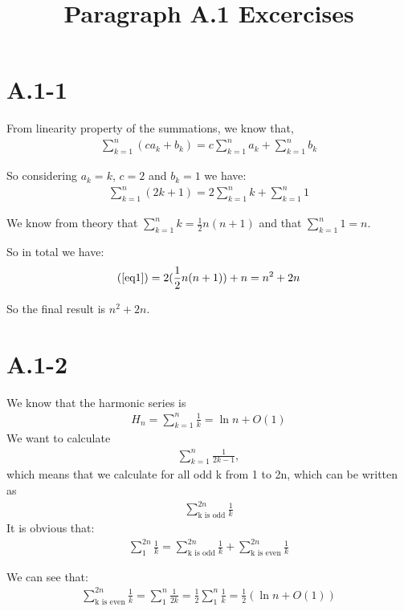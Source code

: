 \documentclass{article}
\title{Paragraph A.1 Excercises}
\begin{document}
\date{}
\author{}

\maketitle

\section*{A.1-1}
From linearity property of the summations, we know that,\begin{gather*}
    \sum_{k=1}^{n}{(ca_{k} + b_{k})} = c\sum_{k=1}^{n}{a_{k}} + \sum_{k=1}^{n}{b_{k}}
\end{gather*} 

So considering $a_{k} = k$, $c = 2$ and $b_{k} = 1$ we have:
\begin{gather}
    \sum_{k=1}^{n}{(2k + 1)} = 2\sum_{k=1}^{n}{k} + \sum_{k=1}^{n}{1} \label{eq1}
\end{gather} 

We know from theory that $\sum_{k=1}^{n}{k} = \frac{1}{2}n(n+1)$ and that $\sum_{k=1}^{n}{1} = n$.

So in total we have:
\begin{gather*}
    (\ref{eq1}) = 2(\frac{1}{2}n(n+1)) + n = n^{2} + 2n
\end{gather*}

So the final result is $n^{2} + 2n$.

\section*{A.1-2}
We know that the harmonic series is 
\begin{gather*}
    H_{n} = \sum_{k=1}^{n}{\frac{1}{k}} = \ln{n} + O(1)
\end{gather*}
We want to calculate 
\begin{gather*}
    \sum_{k=1}^{n}{\frac{1}{2k-1}}, 
\end{gather*}    
which means that we calculate for all odd k from 1 to 2n, which can be written as 
\begin{gather*}
    \sum_{\text{k is odd}}^{2n}{\frac{1}{k}}
\end{gather*}
It is obvious that:
\begin{gather}
    \sum_{1}^{2n}{\frac{1}{k}} = \sum_{\text{k is odd}}^{2n}{\frac{1}{k}} + \sum_{\text{k is even}}^{2n}{\frac{1}{k}} \label{sum2}
\end{gather}

We can see that:
\begin{gather}
    \sum_{\text{k is even}}^{2n}{\frac{1}{k}} = \sum_{1}^{n}{\frac{1}{2k}} = \frac{1}{2} \sum_{1}^{n}{\frac{1}{k}} = \frac{1}{2}(\ln{n} + O(1)) \label{sum3} 
\end{gather}
\end{document}
